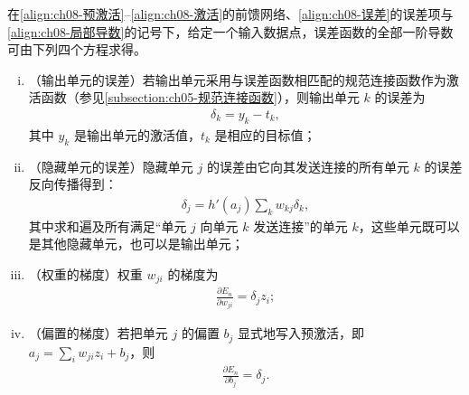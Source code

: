 \documentclass[../../main.tex]{subfiles}
\begin{document}
\begin{theorem}[反向传播的四个基本方程]\label{theorem:ch08-反向传播方程}
在\eqref{align:ch08-预激活}--\eqref{align:ch08-激活}的前馈网络、\eqref{align:ch08-误差}的误差项与\eqref{align:ch08-局部导数}的记号下，给定一个输入数据点，误差函数的全部一阶导数可由下列四个方程求得。
\begin{enumerate}[(i)]
\item\label{item:ch08-输出误差}（输出单元的误差）若输出单元采用与误差函数相匹配的规范连接函数作为激活函数（参见\cref{subsection:ch05-规范连接函数}），则输出单元 $k$ 的误差为
\begin{align}
\delta_k=y_k-t_k,
\label{align:ch08-输出误差}
\end{align}
其中 $y_k$ 是输出单元的激活值，$t_k$ 是相应的目标值；
\item\label{item:ch08-隐藏误差}（隐藏单元的误差）隐藏单元 $j$ 的误差由它向其发送连接的所有单元 $k$ 的误差反向传播得到：
\begin{align}
\delta_j=h'(a_j)\sum_{k}w_{kj}\delta_k,
\label{align:ch08-隐藏误差}
\end{align}
其中求和遍及所有满足“单元 $j$ 向单元 $k$ 发送连接”的单元 $k$，这些单元既可以是其他隐藏单元，也可以是输出单元；
\item\label{item:ch08-权重梯度}（权重的梯度）权重 $w_{ji}$ 的梯度为
\begin{align}
\frac{\partial E_n}{\partial w_{ji}}=\delta_j z_i;
\label{align:ch08-权重梯度}
\end{align}
\item\label{item:ch08-偏置梯度}（偏置的梯度）若把单元 $j$ 的偏置 $b_j$ 显式地写入预激活，即 $a_j=\sum_i w_{ji}z_i+b_j$，则
\begin{align}
\frac{\partial E_n}{\partial b_j}=\delta_j.
\label{align:ch08-偏置梯度}
\end{align}
\end{enumerate}
\end{theorem}
\end{document}
